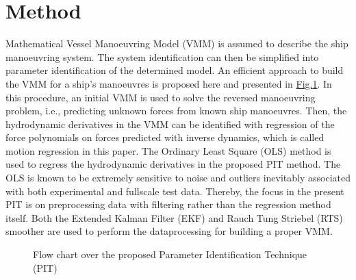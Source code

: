 \documentclass[review]{elsarticle}
\let\sphinxpxdimen\pdfpxdimen\else\newdimen\sphinxpxdimen
\begin{document}
\section{Method}
\label{\detokenize{01.01_method:method}}\label{\detokenize{01.01_method:id1}}\label{\detokenize{01.01_method::doc}}
\sphinxAtStartPar
Mathematical Vessel Manoeuvring Model (VMM) is assumed to describe the ship manoeuvring system. The system identification can then be simplified into parameter identification of the determined model. An efficient approach to build the VMM for a ship’s manoeuvres is proposed here and presented in \hyperref[\detokenize{01.01_method:overview}]{Fig.\@ \ref{\detokenize{01.01_method:overview}}}.
In this procedure, an initial VMM is used to solve the reversed manoeuvring problem, i.e., predicting unknown forces from known ship manoeuvres. Then, the hydrodynamic derivatives in the VMM can be identified with regression of the force polynomials on forces predicted with inverse dynamics, which is called motion regression in this paper. The Ordinary Least Square (OLS) method is used to regress the hydrodynamic derivatives in the proposed PIT method. The OLS is known to be extremely sensitive to noise and outliers inevitably associated with both experimental and full\sphinxhyphen{}scale test data. Thereby, the focus in the present PIT is on pre\sphinxhyphen{}processing data with filtering rather than the regression method itself. Both the Extended Kalman Filter (EKF) and Rauch Tung Striebel (RTS) smoother are used to perform the data\sphinxhyphen{}processing for building a proper VMM.

\begin{figure}[H]
\centering
\capstart

\noindent\sphinxincludegraphics[width=500\sphinxpxdimen]{{method}.png}
\caption{Flow chart over the proposed Parameter Identification Technique (PIT)}\label{\detokenize{01.01_method:overview}}\end{figure}
\end{document}
